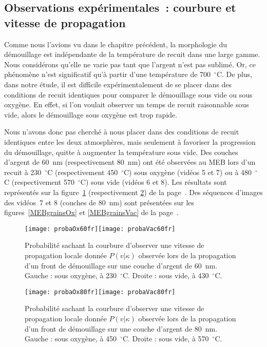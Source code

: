 		\subsection{Observations expérimentales~: courbure et vitesse de propagation}
Comme nous l'avions vu dans le chapitre précédent, la morphologie du démouillage est indépendante de la température de recuit dans une large gamme. Nous considérons qu'elle ne varie pas tant que l'argent n'est pas sublimé. Or, ce phénomène n'est significatif qu'à partir d'une température de 700~$^\circ$C. De plus, dans notre étude, il est difficile expérimentalement de se placer dans des conditions de recuit identiques pour comparer le démouillage sous vide ou sous oxygène. En effet, si l'on voulait observer un temps de recuit raisonnable sous vide, alors le démouillage sous oxygène est trop rapide.\par 
Nous n'avons donc pas cherché à nous placer dans des conditions de recuit identiques entre les deux atmosphères, mais seulement à favoriser la progression du démouillage, quitte à augmenter la température sous vide. Des couches d'argent de 60~nm (respectivement 80~nm) ont été observées au MEB lors d'un recuit à 230~$^\circ$C (respectivement 450~$^\circ$C) sous oxygène (vidéos 5 et 7)  ou à 480~$^\circ$C (respectivement 570~$^\circ$C) sous vide (vidéos 6 et 8). Les résultats sont représentés sur la figure~\ref{proba60} (respectivement \ref{proba80}) de la page~\pageref{proba60}.
Des séquences d'images des vidéos~7 et 8 (couches de 80~nm) sont présentées sur les figures~\ref{MEBgrainsOx} et \ref{MEBgrainsVac} de la page~\pageref{MEBgrainsOx}.\par 
\begin{figure}[!p]
\centering
\texttt{[image: probaOx60fr]}\texttt{[image: probaVac60fr]}
\caption{Probabilité sachant la courbure d'observer une vitesse de propagation locale donnée $P(v|\kappa)$ observée lors de la propagation d'un front de démouillage sur une couche d'argent de 60~nm. Gauche : sous oxygène, à 230~$^\circ$C. Droite : sous vide, à 430~$^\circ$C.}
\label{proba60}
\end{figure}

\begin{figure}[!p]
\centering
\texttt{[image: probaOx80fr]}\texttt{[image: probaVac80fr]}
\caption{Probabilité sachant la courbure d'observer une vitesse de propagation locale donnée $P(v|\kappa)$ observée lors de la propagation d'un front de démouillage sur une couche d'argent de 80~nm. Gauche : sous oxygène, à 450~$^\circ$C. Droite : sous vide, à 570~$^\circ$C.}
\label{proba80}
\end{figure}

